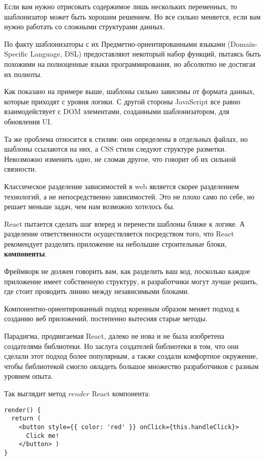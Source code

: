 Если вам нужно отрисовать содержимое лишь нескольких переменных, то шаблонизатор может быть хорошим решением. Но все сильно меняется, если вам нужно работать со сложными структурами данных.

По факту шаблонизаторы с их Предметно-ориентированными языками (Domain-Specific Language, DSL) предоставляют некоторый набор функций, пытаясь быть похожими на полноценные языки программирования, но абсолютно не достигая их полноты.

Как показано на примере выше, шаблоны сильно зависимы от формата данных, которые приходят с уровня логики. С другой стороны JavaScript все равно взаимодействует с DOM элементами, созданными шаблонизатором, для обновления UI. 

Та же проблема относится к стилям: они определены в отдельных файлах, но шаблоны ссылаются на них, а CSS стили следуют структуре разметки. Невозможно изменить одно, не сломав другое, что говорит об их сильной связности.

Классическое разделение зависимостей в web является скорее разделением технологий, а не непосредственно зависимостей. Это не плохо само по себе, но решает меньше задач, чем нам возможно хотелось бы.

React пытается сделать шаг вперед и перенести шаблоны ближе к логике. А разделение ответственности осуществляется посредством того, что React рекомендует разделять приложение на небольшие строительные блоки, \textbf{компоненты}.

Фреймворк не должен говорить вам, как разделить ваш код, посколько каждое приложение имеет собственную структуру, и разработчики могут лучше решить, где стоит проводить линию между независимыми блоками.

Компонентно-ориентированный подход коренным образом меняет подход к созданию веб приложений, постепенно вытесняя старые методы.

Парадигма, продвигаемая React, далеко не нова и не была изобретена создателями библиотеки. Но заслуга создателей библиотеки в том, что они сделали этот подход более популярным, а также создали комфортное окружение, чтобы библиотекой смогло овладеть большое множество разработчиков с разным уровнем опыта.

Так выглядит метод $render$ React компонента:

\begin{lstlisting}
render() {
  return (
    <button style={{ color: 'red' }} onClick={this.handleClick}>
      Click me!
    </button> )
}
\end{lstlisting}


